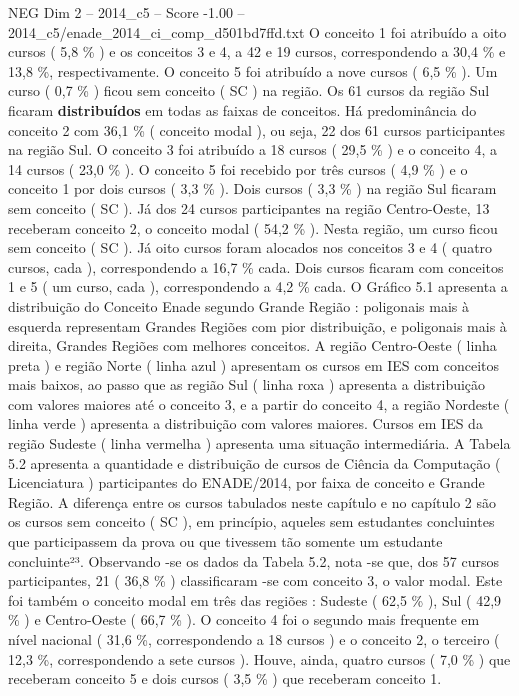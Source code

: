 \begin{textsample}{NEG Dim 2 – 2014\_c5 – Score -1.00 – 2014\_c5/enade\_2014\_ci\_comp\_d501bd7ffd.txt}
O conceito 1 foi atribuído a oito cursos ( 5,8 \% ) e os conceitos 3 e 4, a 42 e 19 cursos, correspondendo a 30,4 \% e 13,8 \%, respectivamente.
O conceito 5 foi atribuído a nove cursos ( 6,5 \% ).
Um curso ( 0,7 \% ) ficou sem conceito ( SC ) na região.
Os 61 cursos da região Sul ficaram \textbf{distribuídos} em todas as faixas de conceitos.
Há predominância do conceito 2 com 36,1 \% ( conceito modal ), ou seja, 22 dos 61 cursos participantes na região Sul.
O conceito 3 foi atribuído a 18 cursos ( 29,5 \% ) e o conceito 4, a 14 cursos ( 23,0 \% ).
O conceito 5 foi recebido por três cursos ( 4,9 \% ) e o conceito 1 por dois cursos ( 3,3 \% ).
Dois cursos ( 3,3 \% ) na região Sul ficaram sem conceito ( SC ).
Já dos 24 cursos participantes na região Centro-Oeste, 13 receberam conceito 2, o conceito modal ( 54,2 \% ).
Nesta região, um curso ficou sem conceito ( SC ).
Já oito cursos foram alocados nos conceitos 3 e 4 ( quatro cursos, cada ), correspondendo a 16,7 \% cada.
Dois cursos ficaram com conceitos 1 e 5 ( um curso, cada ), correspondendo a 4,2 \% cada.
O Gráfico 5.1 apresenta a distribuição do Conceito Enade segundo Grande Região : poligonais mais à esquerda representam Grandes Regiões com pior distribuição, e poligonais mais à direita, Grandes Regiões com melhores conceitos.
A região Centro-Oeste ( linha preta ) e região Norte ( linha azul ) apresentam os cursos em IES com conceitos mais baixos, ao passo que as região Sul ( linha roxa ) apresenta a distribuição com valores maiores até o conceito 3, e a partir do conceito 4, a região Nordeste ( linha verde ) apresenta a distribuição com valores maiores.
Cursos em IES da região Sudeste ( linha vermelha ) apresenta uma situação intermediária.
A Tabela 5.2 apresenta a quantidade e distribuição de cursos de Ciência da Computação ( Licenciatura ) participantes do ENADE/2014, por faixa de conceito e Grande Região.
A diferença entre os cursos tabulados neste capítulo e no capítulo 2 são os cursos sem conceito ( SC ), em princípio, aqueles sem estudantes concluintes que participassem da prova ou que tivessem tão somente um estudante concluinte²³.
Observando -se os dados da Tabela 5.2, nota -se que, dos 57 cursos participantes, 21 ( 36,8 \% ) classificaram -se com conceito 3, o valor modal.
Este foi também o conceito modal em três das regiões : Sudeste ( 62,5 \% ), Sul ( 42,9 \% ) e Centro-Oeste ( 66,7 \% ).
O conceito 4 foi o segundo mais frequente em nível nacional ( 31,6 \%, correspondendo a 18 cursos ) e o conceito 2, o terceiro ( 12,3 \%, correspondendo a sete cursos ).
Houve, ainda, quatro cursos ( 7,0 \% ) que receberam conceito 5 e dois cursos ( 3,5 \% ) que receberam conceito 1.

\end{textsample}
